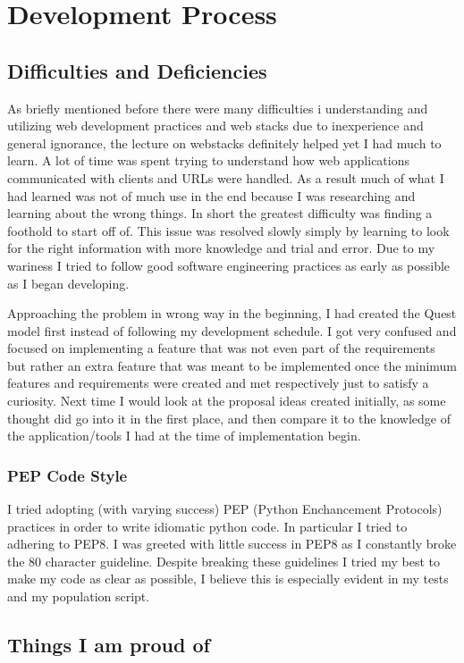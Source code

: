 \documentclass[11pt,a4paper]{article}
\begin{document}
\section{Development Process}
\subsection{Difficulties and Deficiencies}
As briefly mentioned before there were many difficulties i understanding and utilizing web development practices and web stacks due to inexperience and general ignorance, the lecture on webstacks definitely helped yet I had much to learn. A lot of time was spent trying to understand how web applications communicated with clients and URLs were handled. As a result much of what I had learned was not of much use in the end because I was researching and learning about the wrong things. In short the greatest difficulty was finding a foothold to start off of. This issue was resolved slowly simply by learning to look for the right information with more knowledge and trial and error. Due to my wariness I tried to follow good software engineering practices as early as possible as I began developing.

Approaching the problem in wrong way in the beginning, I had created the Quest model first instead of following my development schedule. I got very confused and focused on implementing a feature that was not even part of the requirements but rather an extra feature that was meant to be implemented once the minimum features and requirements were created and met respectively just to satisfy a curiosity. Next time I would look at the proposal ideas created initially, as some thought did go into it in the first place, and then compare it to the knowledge of the application/tools I had at the time of implementation begin.

\subsubsection{PEP Code Style}
I tried adopting (with varying success) PEP (Python Enchancement Protocols) practices in order to write idiomatic python code. In particular I tried to adhering to PEP8. I was greeted with little success in PEP8 as I constantly broke the 80 character guideline. Despite breaking these guidelines I tried my best to make my code as clear as possible, I believe this is especially evident in my tests and my population script.

\subsection{Things I am proud of}
\end{document}

